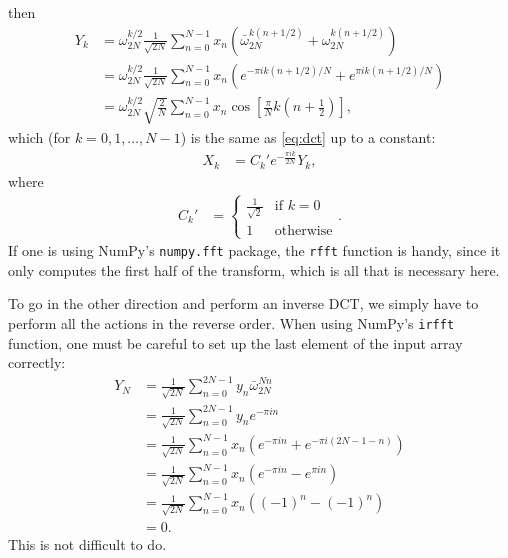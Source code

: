 then
\begin{subequations}
\begin{align}
	Y_k
	&= \omega_{2 N}^{k/2} \frac{1}{\sqrt{2 N}} \sum_{n=0}^{N - 1} x_n (\bar{\omega}_{2 N}^{k (n + 1/2)} + \omega_{2 N}^{k (n + 1/2)}) \\
	&= \omega_{2 N}^{k/2} \frac{1}{\sqrt{2 N}} \sum_{n=0}^{N - 1} x_n (e^{-\pi i k (n + 1/2) / N} + e^{\pi i k (n + 1/2) / N}) \\
	&= \omega_{2 N}^{k/2} \sqrt{\frac{2}{N}} \sum_{n=0}^{N - 1} x_n \cos{\left[ \frac{\pi}{N} k \left( n + \frac{1}{2} \right) \right]},
\end{align}
\end{subequations}
which (for $k = 0, 1, \ldots, N - 1$) is the same as \cref{eq:dct} up to a constant:
\begin{align}
	X_k
	&= C_k' e^{-\frac{\pi i k}{2 N}} Y_k,
\end{align}
where
\begin{align}
	C_k'
	&= \begin{cases}
			\frac{1}{\sqrt{2}} & \text{if } k = 0 \\
			1 & \text{otherwise}
		\end{cases}.
\end{align}
If one is using NumPy's \texttt{numpy.fft} package, the \texttt{rfft} function is handy, since it only computes the first half of the transform, which is all that is necessary here.

To go in the other direction and perform an inverse DCT, we simply have to perform all the actions in the reverse order.
When using NumPy's \texttt{irfft} function, one must be careful to set up the last element of the input array correctly:
\begin{subequations}
\begin{align}
	Y_N
	&= \frac{1}{\sqrt{2 N}} \sum_{n=0}^{2 N - 1} y_n \bar{\omega}_{2 N}^{N n} \\
	&= \frac{1}{\sqrt{2 N}} \sum_{n=0}^{2 N - 1} y_n e^{-\pi i n} \\
	&= \frac{1}{\sqrt{2 N}} \sum_{n=0}^{N - 1} x_n (e^{-\pi i n} + e^{-\pi i (2 N - 1 - n)}) \\
	&= \frac{1}{\sqrt{2 N}} \sum_{n=0}^{N - 1} x_n (e^{-\pi i n} - e^{\pi i n}) \\
	&= \frac{1}{\sqrt{2 N}} \sum_{n=0}^{N - 1} x_n ((-1)^n - (-1)^n) \\
	&= 0.
\end{align}
\end{subequations}
This is not difficult to do.
